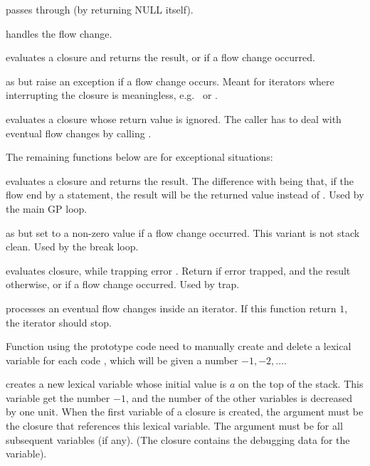 \item passes through (by returning NULL itself).

\item handles the flow change.

 evaluates a closure and returns the result,
or  if a flow change occurred.

 as  but raise
an exception if a flow change occurs. Meant for iterators where
interrupting the closure is meaningless, e.g.~ or .

 evaluates a closure whose return
value is ignored. The caller has to deal with eventual flow changes by
calling .

The remaining functions below are for exceptional situations:

 evaluates a closure and returns the result.
The difference with  being that, if the flow end by a
 statement, the result will be the returned value instead of
. Used by the main GP loop.

 as 
but set  to a non-zero value if a flow change occurred. This
variant is not stack clean. Used by the break loop.

 evaluates closure, while
trapping error . Return  if error trapped, and the
result otherwise, or  if a flow change occurred. Used by trap.



 processes an eventual flow changes inside an iterator. If this function return $1$, the iterator should stop.

\label{se:pushlex}

Function using the prototype code  need to manually create and delete a
lexical variable for each code , which will be given a number $-1, -2,
\ldots$.

 creates a new lexical variable whose
initial value is $a$ on the top of the stack. This variable get the number
$-1$, and the number of the other variables is decreased by one unit. When
the first variable of a closure is created, the argument  must be the
closure that references this lexical variable. The argument  must be
 for all subsequent variables (if any).  (The closure contains the
debugging data for the variable).

